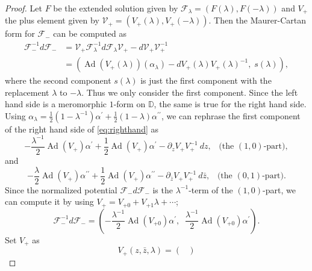 \documentclass[12pt]{amsart}
\theoremstyle{definition}
\theoremstyle{remark}
\numberwithin{equation}{section}
\begin{document}
\begin{proof}
 Let $F$ be the extended solution given by ${\mathcal F}_{\lambda} = (F({\lambda}), F(-{\lambda}))$ and 
 $V_+$ the plus element given by ${\mathcal V}_+ =(V_+({\lambda}), V_+(-{\lambda}))$.
 Then the Maurer-Cartan form for ${\mathcal F}_-$ can be computed as 
\begin{align}
 {\mathcal F}_-^{-1} d {\mathcal F}_{-} &= {\mathcal V}_+ {\mathcal F}_{\lambda}^{-1} d {\mathcal F}_{\lambda} {\mathcal V}_+- d {\mathcal V}_+ {\mathcal V}_+^{-1} \nonumber \\
 & = \left({\operatorname{Ad}} (V_+({\lambda})) (\alpha_{\lambda}) - d V_+({\lambda}) V_+({\lambda})^{-1}, \; s({\lambda})
      \right),\label{eq:righthand}
\end{align}
 where the second component $s({\lambda})$ is just the first component 
 with the replacement ${\lambda}$ to $-{\lambda}$. Thus we only consider the first component.
 Since the left hand side is a meromorphic $1$-form on ${\mathbb D}$, the same is true for the 
 right hand side. 
 Using $\alpha_{\lambda} = \frac{1}{2}(1- {\lambda}^{-1}) \alpha^{\prime} + 
 \frac{1}{2}(1- {\lambda}) \alpha^{\prime \prime}$, we can rephrase the first 
 component of the right hand side of \eqref{eq:righthand} as 
\begin{equation}\label{eq:alphagauge}
 -\frac{{\lambda}^{-1}}{2} {\operatorname{Ad}} (V_+) \alpha^{\prime} + 
 \frac{1}{2} {\operatorname{Ad}} (V_+) \alpha^{\prime} - \partial_{z}V_+ V_+^{-1} \>dz, 
 \;\;\;\mbox{(the $(1, 0)$-part)},
\end{equation}
 and 
\begin{equation}\label{eq:alphagauge2}
 - \frac{\lambda}{2}{\operatorname{Ad}} (V_+) \alpha^{\prime \prime} + 
 \frac{1}{2} {\operatorname{Ad}} (V_+) \alpha^{\prime \prime} - \partial_{\bar z}V_+ V_+^{-1} \>d\bar z, 
 \;\;\;\mbox{(the $(0, 1)$-part)}.
\end{equation}
 Since the normalized potential  ${\mathcal F}_{-} d {\mathcal F}_{-}$ is the ${\lambda}^{-1}$-term of 
 the $(1, 0)$-part, we can compute it by 
 using $V_+ = V_{+0} + V_{+1} {\lambda} + \cdots$;
\begin{equation*}
 {\mathcal F}_-^{-1} d {\mathcal F}_{-} =\left(-\frac{{\lambda}^{-1}}{2} {\operatorname{Ad}} (V_{+0}) \alpha^{\prime}, \;\;
\frac{{\lambda}^{-1}}{2} {\operatorname{Ad}} (V_{+0}) \alpha^{\prime}\right).
\end{equation*}
 Set $V_{+}$ as 
\begin{equation*}
 V_{+}(z, \bar z, {\lambda}) =
 \begin{pmatrix} 

\end{pmatrix}
\end{equation*}
\end{proof}
\end{document}
